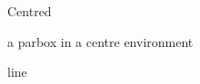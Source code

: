 \documentclass[12pt]{article}
\begin{document}
\begin{center}
Centred \parbox[t]{4cm}{a parbox in a centre environment} line
\end{center}
\end{document}
